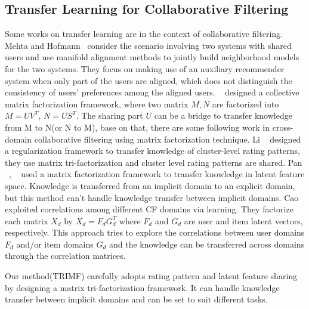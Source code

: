 \subsection{Transfer Learning for Collaborative Filtering}
Some works on transfer learning are in the context of collaborative filtering.
Mehta and Hofmann~\cite{/ki/bhaskar06cross} consider the scenario involving two systems with shared users and use manifold alignment methods to jointly build neighborhood models for the two systems. They focus on making use of an auxiliary recommender system when only part of the users are aligned, which does not distinguish the consistency of users' preferences among the aligned users.
~\cite{/kdd/SinghG08} designed a collective matrix factorization framework, where two matrix $M, N$ are factorized into $M = UV^T$, $N = US^T$. The sharing part $U$ can be a bridge to transfer knowledge from M to N(or N to M), base on that, there are some following work in cross-domain collaborative filtering using matrix factorization technique.
Li \etal~\cite{/icml/libin09} designed a regularization framework to transfer knowledge of cluster-level rating patterns, they use matrix tri-factorization and cluster level rating patterns are shared.
Pan \etal~\cite{/ijcai/PanLXY11}, ~\cite{AAAI101649} used a matrix factorization framework to transfer knowledge in latent feature space. Knowledge is transferred from an implicit domain to an explicit domain, but this method can’t handle knowledge transfer between implicit domains.
Cao \etal~\cite{cao2010transfer} exploited correlations among different CF domains via learning. They factorize each matrix $X_d$ by $X_d = F_d G_d^T$ where $F_d$ and $G_d$ are user and item latent vectors, respectively. This approach tries to explore the correlations between user domains {$F_d$} and/or item domains {$G_d$} and the knowledge can be
transferred across domains through the correlation matrices.

Our method(TRIMF) carefully adopts rating pattern and latent feature sharing by designing a matrix tri-factorization framework. It can handle knowledge transfer between implicit domains and can be set to suit different tasks.

\hspace{0.05in}

